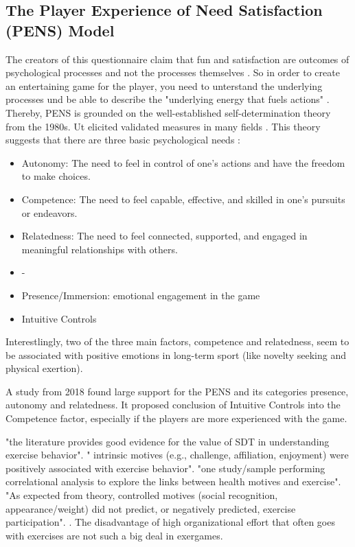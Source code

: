 \subsection{The Player Experience of Need Satisfaction (PENS) Model}
The creators of this questionnaire claim that fun and satisfaction are outcomes of psychological processes and not the processes themselves \cite{rigby2007player}. So in order to create an entertaining game for the player, you need to unterstand the underlying processes und be able to describe the "underlying energy that fuels actions" \cite{rigby2007player}. Thereby, PENS is grounded on the well-established self-determination theory from the 1980s. Ut elicited validated measures in many fields \cite{pietrabissa2020development,lohmann2017measuring,richards2021further}. This theory suggests that there are three basic psychological needs \cite{deci1985intrinsic}:
\begin{itemize}
	\item Autonomy: The need to feel in control of one's actions and have the freedom to make choices.
	\item Competence: The need to feel capable, effective, and skilled in one's pursuits or endeavors.
	\item Relatedness: The need to feel connected, supported, and engaged in meaningful relationships with others.
	\item -
	\item Presence/Immersion: emotional engagement in the game
	\item Intuitive Controls
\end{itemize}

Interestlingly, two of the three main factors, competence and relatedness, seem to be associated with positive emotions in long-term sport \cite{wienke2016qualitative} (like novelty seeking and physical exertion).

A study from 2018 found large support for the PENS \cite{johnson2018validation} and its categories presence, autonomy and relatedness. It proposed conclusion of Intuitive Controls into the Competence factor, especially if the players are more experienced with the game.

"the literature provides good evidence for the value of SDT in understanding exercise behavior". " intrinsic motives (e.g., challenge, affiliation, enjoyment) were positively associated with exercise behavior". "one study/sample performing correlational analysis to explore the links between health motives and exercise". "As expected from theory, controlled motives (social recognition, appearance/weight) did not predict, or negatively predicted, exercise participation". \cite{teixeira2012exercise}.
The disadvantage of high organizational effort that often goes with exercises \cite{mullan97variations} are not such a big deal in exergames.

